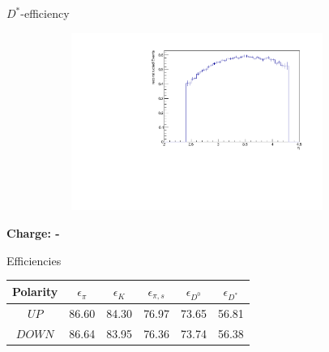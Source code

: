 \documentclass[11pt]{beamer}
\begin{document}
\begin{frame}{$D^*$-efficiency}
\begin{figure}
\begin{subfigure}{0.45\textwidth}
\end{subfigure}
\begin{subfigure}{0.45\textwidth}
\includegraphics[width=0.9\textwidth]{up_pdf/pos/h_eta_reco_Dst_pos.pdf}
\end{subfigure}
\end{figure}
\end{frame}
\begin{frame}
\begin{LARGE}
\textbf{Charge: -}
\end{LARGE}
\end{frame}
\begin{frame}{Efficiencies}
\begin{table}
	\begin{tabular}{cS[table-format=2.4]S[table-format=2.4]S[table-format=2.4]S[table-format=2.4]S[table-format=2.4]}
		\toprule
		{Polarity} & {$\epsilon_{\pi} $} & {$\epsilon_{K} $} & {$ \epsilon_{\pi,s} $} & {$\epsilon_{D^0} $} & {$\epsilon_{D^*} $} \\
		\midrule
		$UP$ & 86.60  & 84.30  & 76.97  & 73.65  & 56.81  \\
		$DOWN$ & 86.64   & 83.95  & 76.36  & 73.74  & 56.38  \\
		\bottomrule
	\end{tabular}
\end{table}
\end{frame}
\end{document}
